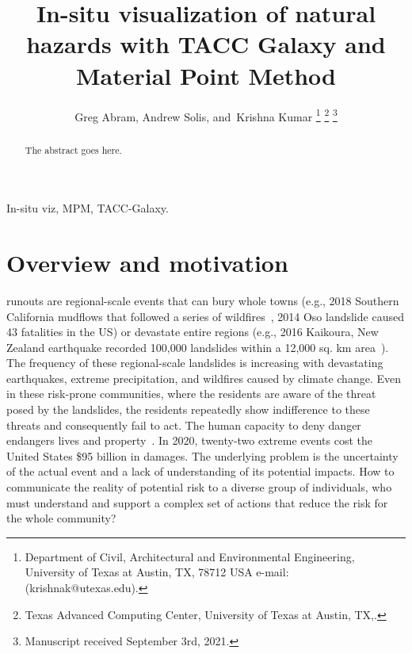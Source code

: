 \documentclass[journal]{IEEEtran}
\begin{document}
\title{In-situ visualization of natural hazards with TACC Galaxy and Material Point Method}
\author{Greg Abram, %
        Andrew Solis,
        and~Krishna Kumar%
\thanks{Department of Civil, Architectural and Environmental Engineering, University of Texas at Austin, TX, 78712 USA e-mail: (krishnak@utexas.edu).}%
\thanks{Texas Advanced Computing Center, University of Texas at Austin, TX,.}%
\thanks{Manuscript received September 3rd, 2021.}}

%
{}


\maketitle

\begin{abstract}
The abstract goes here.
\end{abstract}

\begin{IEEEkeywords}
In-situ viz, MPM, TACC-Galaxy.
\end{IEEEkeywords}

\IEEEpeerreviewmaketitle

\section{Overview and motivation}
 runouts are regional-scale events that can bury whole towns (e.g., 2018 Southern California mudflows that followed a series of wildfires~\cite{lukashov2019post}, 2014 Oso landslide caused 43 fatalities in the US) or devastate entire regions (e.g., 2016 Kaikoura, New Zealand earthquake recorded 100,000 landslides within a 12,000 sq. km area~\cite{dellow2017landslides}). The frequency of these regional-scale landslides is increasing with devastating earthquakes, extreme precipitation, and wildfires caused by climate change. Even in these risk-prone communities, where the residents are aware of the threat posed by the landslides, the residents repeatedly show indifference to these threats and consequently fail to act. The human capacity to deny danger endangers lives and property~\cite{kim2020public}. In 2020, twenty-two extreme events cost the United States \$95 billion in damages. The underlying problem is the uncertainty of the actual event and a lack of understanding of its potential impacts. How to communicate the reality of potential risk to a diverse group of individuals, who must understand and support a complex set of actions that reduce the risk for the whole community?
  
\end{document}
